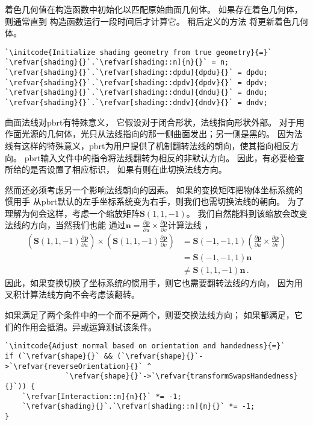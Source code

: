 着色几何值在构造函数中初始化以匹配原始曲面几何体。
如果存在着色几何体，则通常直到
构造函数运行一段时间后才计算它。
稍后定义的方法
将更新着色几何体。
\begin{lstlisting}
`\initcode{Initialize shading geometry from true geometry}{=}`
`\refvar{shading}{}`.`\refvar[shading::n]{n}{}` = n;
`\refvar{shading}{}`.`\refvar[shading::dpdu]{dpdu}{}` = dpdu;
`\refvar{shading}{}`.`\refvar[shading::dpdv]{dpdv}{}` = dpdv;
`\refvar{shading}{}`.`\refvar[shading::dndu]{dndu}{}` = dndu;
`\refvar{shading}{}`.`\refvar[shading::dndv]{dndv}{}` = dndv;
\end{lstlisting}

曲面法线对pbrt有特殊意义，
它假设对于闭合形状，法线指向形状外部。
对于用作面光源的几何体，光只从法线指向的那一侧曲面发出；另一侧是黑的。
因为法线有这样的特殊意义，pbrt为用户提供了机制翻转法线的朝向，使其指向相反方向。
pbrt输入文件中的指令将法线翻转为相反的非默认方向。
因此，有必要检查所给的是否设置了相应标识，
如果有则在此切换法线方向。

然而还必须考虑另一个影响法线朝向的因素。
如果的变换矩阵把物体坐标系统的惯用手
从pbrt默认的左手坐标系统变为右手，则我们也需切换法线的朝向。
为了理解为何会这样，考虑一个缩放矩阵$\bm S(1,1,-1)$。
我们自然能料到该缩放会改变法线的方向，当然我们也能
通过$\displaystyle\bm n=\frac{\partial\bm p}{\partial u}\times\frac{\partial\bm p}{\partial v}$计算法线
，
\begin{align*}
    \left(\bm S(1,1,-1)\frac{\partial\bm p}{\partial u}\right)\times\left(\bm S(1,1,-1)\frac{\partial\bm p}{\partial v}\right) & =\bm S(-1,-1,1)\left(\frac{\partial\bm p}{\partial u}\times\frac{\partial\bm p}{\partial v}\right) \\
                                                                                                                               & =\bm S(-1,-1,1)\bm n                                                                               \\
                                                                                                                               & \neq \bm S(1,1,-1)\bm n\, .
\end{align*}
因此，如果变换切换了坐标系统的惯用手，则它也需要翻转法线的方向，
因为用叉积计算法线方向不会考虑该翻转。

如果满足了两个条件中的一个而不是两个，则要交换法线方向；
如果都满足，它们的作用会抵消。异或运算测试该条件。
\begin{lstlisting}
`\initcode{Adjust normal based on orientation and handedness}{=}`
if (`\refvar{shape}{}` && (`\refvar{shape}{}`->`\refvar{reverseOrientation}{}` ^
              `\refvar{shape}{}`->`\refvar{transformSwapsHandedness}{}`)) {
    `\refvar[Interaction::n]{n}{}` *= -1;
    `\refvar{shading}{}`.`\refvar[shading::n]{n}{}` *= -1;
}
\end{lstlisting}

